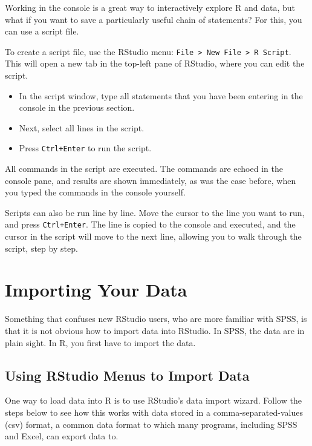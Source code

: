 \documentclass[]{book}
\begin{document}

Working in the console is a great way to interactively explore R and
data, but what if you want to save a particularly useful chain of
statements? For this, you can use a script file.

To create a script file, use the RStudio menu:
\texttt{File\ \textgreater{}\ New\ File\ \textgreater{}\ R\ Script}.
This will open a new tab in the top-left pane of RStudio, where you can
edit the script.

\begin{itemize}
\item
  In the script window, type all statements that you have been entering
  in the console in the previous section.
\item
  Next, select all lines in the script.
\item
  Press \texttt{Ctrl+Enter} to run the script.
\end{itemize}

All commands in the script are executed. The commands are echoed in the
console pane, and results are shown immediately, as was the case before,
when you typed the commands in the console yourself.

Scripts can also be run line by line. Move the cursor to the line you
want to run, and press \texttt{Ctrl+Enter}. The line is copied to the
console and executed, and the cursor in the script will move to the next
line, allowing you to walk through the script, step by step.

\section{Importing Your Data}\label{importing-your-data}


Something that confuses new RStudio users, who are more familiar with
SPSS, is that it is not obvious how to import data into RStudio. In
SPSS, the data are in plain sight. In R, you first have to import the
data.

\subsection{Using RStudio Menus to Import
Data}\label{using-rstudio-menus-to-import-data}

One way to load data into R is to use RStudio's data import wizard.
Follow the steps below to see how this works with data stored in a
comma-separated-values (csv) format, a common data format to which many
programs, including SPSS and Excel, can export data to.
\end{document}
